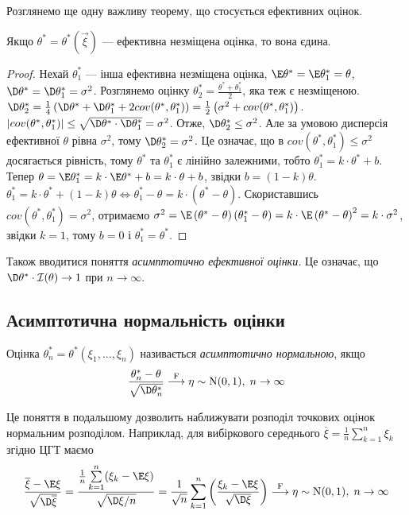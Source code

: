 Розглянемо ще одну важливу теорему, що стосується ефективних оцінок.
\begin{theorem*}
    Якщо $\theta^* = \theta^* (\vec{\xi})$ --- ефективна незміщена оцінка, то вона єдина.
\end{theorem*}
\begin{proof}
    Нехай $\theta_1^*$ --- інша ефективна незміщена оцінка, $\E\theta^* = \E\theta_1^* = \theta$,
    $\D\theta^* = \D\theta_1^* = \sigma^2$. Розглянемо оцінку $\theta_2^* = \frac{\theta^* + \theta_1^*}{2}$, яка теж є незміщеною.
    $\D\theta_2^* = \frac{1}{4}\left(\D\theta^* + \D\theta_1^* + 2{cov}(\theta^*, \theta_1^*) \right) = \frac{1}{2}\left( \sigma^2 + {cov}(\theta^*, \theta_1^*)\right)$.
    $\left|{cov}(\theta^*, \theta_1^*) \right| \leq \sqrt{\D\theta^* \cdot \D\theta_1^*} = \sigma^2$.
    Отже, $\D\theta_2^* \leq \sigma^2$. Але за умовою дисперсія ефективної $\theta$ рівна $\sigma^2$, тому $\D\theta_2^* = \sigma^2$.
    Це означає, що в ${cov}(\theta^*, \theta_1^*) \leq \sigma^2$ досягається рівність, тому $\theta^*$ та $\theta_1^*$ є лінійно залежними, тобто
    $\theta_1^* = k\cdot \theta^* + b$. Тепер $\theta = \E\theta_1^* = k\cdot \E\theta^* + b = k\cdot \theta + b$, звідки $b = (1-k)\theta$.
    $\theta_1^* = k\cdot \theta^* + (1-k)\theta \Leftrightarrow \theta_1^* - \theta = k \cdot \left(\theta^* - \theta \right)$.
    Скориставшись ${cov}(\theta^*, \theta_1^*) = \sigma^2$, отримаємо 
    $\sigma^2 = \E\left(\theta^* - \theta \right)\left(\theta_1^* - \theta \right) = k \cdot \E\left(\theta^* - \theta \right)^2 = k \cdot \sigma^2$,
    звідки $k = 1$, тому $b = 0$ і $\theta^*_1 = \theta^*$.
\end{proof}

Також вводитися поняття \emph{асимптотично ефективної оцінки.} Це означає, що 
$\D\theta^* \cdot \mathcal{I}(\theta) \to 1$ при $n\to\infty$.

\subsection{Асимптотична нормальність оцінки}
\begin{definition}
    Оцінка $\theta_n^* = \theta^* (\xi_1, ..., \xi_n)$ називається \emph{асимптотично нормальною}, якщо 
    \begin{gather}
        \frac{\theta_n^* - \theta}{\sqrt{\D\theta_n^*}} \overset{\mathrm{F}}{\longrightarrow} \eta \sim \mathrm{N}(0, 1), \; n \to \infty
    \end{gather}
\end{definition}
Це поняття в подальшому дозволить наближувати розподіл точкових оцінок нормальним розподілом.
Наприклад, для вибіркового середнього $\overline{\xi} = \frac{1}{n} \sum\limits_{k=1}^n \xi_k$ згідно ЦГТ маємо
$$ 
\frac{\overline{\xi} - \E\xi}{\sqrt{\D\overline{\xi}}} = \frac{\frac{1}{n} \sum\limits_{k=1}^n (\xi_k  -\E\xi)}{\sqrt{\D\xi/n}} = 
\frac{1}{\sqrt{n}} \sum\limits_{k=1}^n \left(\frac{\xi_k - \E\xi}{\sqrt{\D\xi}} \right)
\overset{\mathrm{F}}{\longrightarrow} \eta \sim \mathrm{N}(0, 1), \; n \to \infty
$$

